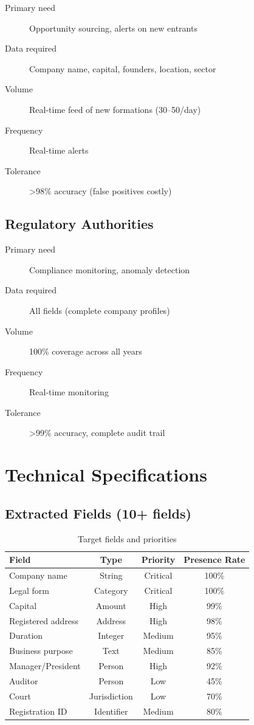 \documentclass[12pt,a4paper]{report}
\begin{document}
\begin{description}
    \item[Primary need] Opportunity sourcing, alerts on new entrants
    \item[Data required] Company name, capital, founders, location, sector
    \item[Volume] Real-time feed of new formations (30--50/day)
    \item[Frequency] Real-time alerts
    \item[Tolerance] >98\% accuracy (false positives costly)
\end{description}

\subsection{Regulatory Authorities}

\begin{description}
    \item[Primary need] Compliance monitoring, anomaly detection
    \item[Data required] All fields (complete company profiles)
    \item[Volume] 100\% coverage across all years
    \item[Frequency] Real-time monitoring
    \item[Tolerance] >99\% accuracy, complete audit trail
\end{description}

\section{Technical Specifications}

\subsection{Extracted Fields (10+ fields)}

\begin{table}[H]
\centering
\small
\begin{tabular}{|l|c|c|c|}
\hline
\textbf{Field} & \textbf{Type} & \textbf{Priority} & \textbf{Presence Rate} \\
\hline
Company name & String & Critical & 100\% \\
Legal form & Category & Critical & 100\% \\
Capital & Amount & High & 99\% \\
Registered address & Address & High & 98\% \\
Duration & Integer & Medium & 95\% \\
Business purpose & Text & Medium & 85\% \\
Manager/President & Person & High & 92\% \\
Auditor & Person & Low & 45\% \\
Court & Jurisdiction & Low & 70\% \\
Registration ID & Identifier & Medium & 80\% \\
\hline
\end{tabular}
\caption{Target fields and priorities}
\end{table}
\end{document}
